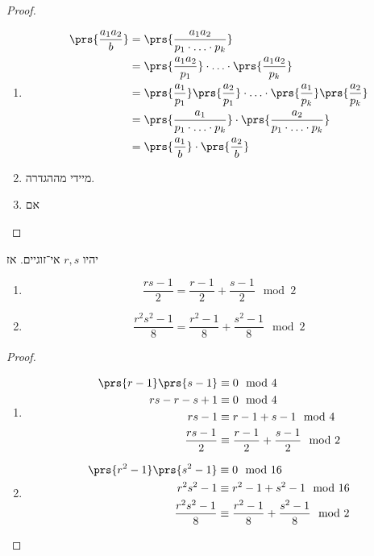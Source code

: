 \documentclass[a4paper,10pt,twoside,openany]{book}
\begin{document}
\begin{proof}
\begin{enumerate}
\item %
\begin{align*}
\prs{\frac{a_1 a_2}{b}} &= \prs{\frac{a_1 a_2}{p_1 \cdot \ldots \cdot p_k}} \\&=
\prs{\frac{a_1 a_2}{p_1}} \cdot \ldots \cdot \prs{\frac{a_1 a_2}{p_k}} \\&=
\prs{\frac{a_1}{p_1}}\prs{\frac{a_2}{p_1}} \cdot \ldots \cdot  \prs{\frac{a_1}{p_k}}\prs{\frac{a_2}{p_k}} \\&=
\prs{\frac{a_1}{p_1 \cdot \ldots \cdot p_k}} \cdot \prs{\frac{a_2}{p_1 \cdot \ldots \cdot p_k}} \\&= \prs{\frac{a_1}{b}} \cdot \prs{\frac{a_2}{b}}
\end{align*}

\item %
מיידי מההגדרה.

\item %
אם
\end{enumerate}
\end{proof}


\begin{lemma} \label{jacobi-lemma}
יהיו
$r,s$
אי־זוגיים. אז
\begin{enumerate}
\item \[\frac{rs - 1}{2} = \frac{r-1}{2} + \frac{s-1}{2} \mod{2}\] \label{jacobi-lemma:formula}
\item \[\frac{r^2 s^2 - 1}{8} = \frac{r^2 - 1}{8} + \frac{s^2 - 1}{8} \mod{2}\] \label{jacobi-lemma:square-formula}
\end{enumerate}
\end{lemma}
\begin{proof}
\begin{enumerate}
\item \begin{align*}
\prs{r-1}\prs{s-1}&\equiv 0 \mod{4} \\
rs - r - s + 1 &\equiv 0 \mod{4} \\
rs - 1 &\equiv r - 1 + s - 1 \mod{4} \\
\frac{rs - 1}{2} &\equiv \frac{r-1}{2} + \frac{s-1}{2} \mod{2}
\end{align*}
\item
\begin{align*}
\prs{r^2 - 1}\prs{s^2 - 1} &\equiv 0 \mod{16} \\
r^2 s^2 - 1 &\equiv r^2 - 1 + s^2 - 1 \mod{16} \\
\frac{r^2 s^2 - 1}{8} &\equiv \frac{r^2 - 1}{8} + \frac{s^2 - 1}{8} \mod{2}
\end{align*}
\end{enumerate}
\end{proof}
\end{document}
